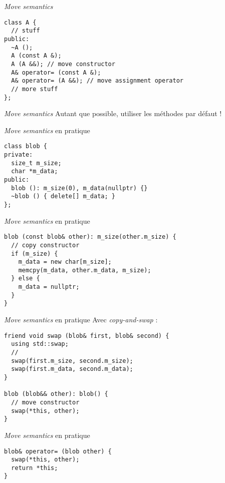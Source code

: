 \begin{frame}[fragile]{\textit{Move semantics}}
  \begin{lstlisting}
class A {
  // stuff
public:
  ~A ();
  A (const A &);
  A (A &&); // move constructor
  A& operator= (const A &);
  A& operator= (A &&); // move assignment operator
  // more stuff
};
  \end{lstlisting}
\end{frame}

\begin{frame}{\textit{Move semantics}}
  Autant que possible, utiliser les méthodes par défaut !
\end{frame}

\begin{frame}[fragile]{\textit{Move semantics} en pratique}
  \begin{lstlisting}
class blob {
private:
  size_t m_size;
  char *m_data;
public:
  blob (): m_size(0), m_data(nullptr) {}
  ~blob () { delete[] m_data; }
};
  \end{lstlisting}
\end{frame}

\begin{frame}[fragile]{\textit{Move semantics} en pratique}
  \begin{lstlisting}
blob (const blob& other): m_size(other.m_size) {
  // copy constructor
  if (m_size) {
    m_data = new char[m_size];
    memcpy(m_data, other.m_data, m_size);
  } else {
    m_data = nullptr;
  }
}
  \end{lstlisting}
\end{frame}

\begin{frame}[fragile]{\textit{Move semantics} en pratique}
  Avec \textit{copy-and-swap} :
  
  \begin{lstlisting}
friend void swap (blob& first, blob& second) {
  using std::swap;
  //
  swap(first.m_size, second.m_size);
  swap(first.m_data, second.m_data);
}

blob (blob&& other): blob() {
  // move constructor
  swap(*this, other);
}
  \end{lstlisting}
\end{frame}

\begin{frame}[fragile]{\textit{Move semantics} en pratique}
  \begin{lstlisting}
blob& operator= (blob other) {
  swap(*this, other);
  return *this;
}
  \end{lstlisting}
\end{frame}

